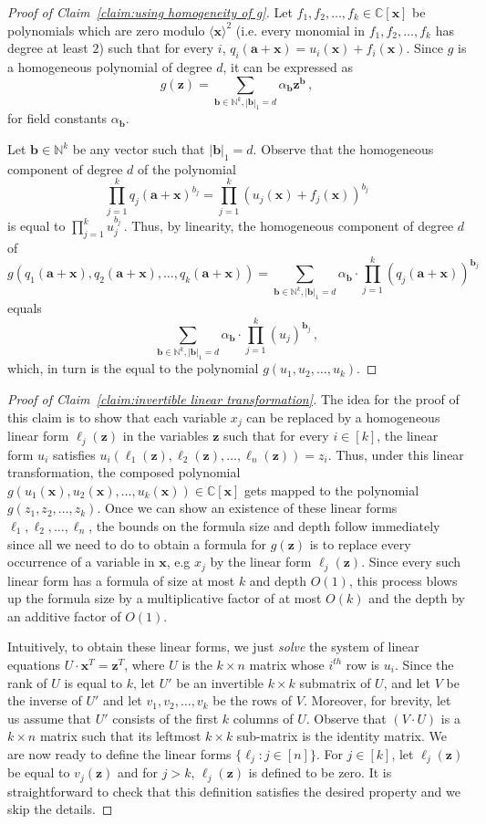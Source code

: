 \documentclass[10pt,a4paper]{article}
\theoremstyle{definition}
\newcommand{\F}{\mathbb C}
\newcommand{\N}{\mathbb N}
\newcommand{\va}{\mathbf a}
\newcommand{\vb}{\mathbf b}
\newcommand{\vx}{\mathbf x}
\newcommand{\vz}{\mathbf z}
\begin{document}
\begin{proof}[Proof of Claim~\ref{claim:using homogeneity of g}]
Let $f_1, f_2, \ldots, f_k \in \F[\vx]$ be polynomials which are zero modulo $\langle \vx \rangle^2$ (i.e. every monomial in $f_1, f_2, \ldots, f_k$ has degree at least $2$) such that for every $i$, $q_i(\va + \vx) = u_i(\vx) + f_i(\vx)$. Since $g$ is a  homogeneous polynomial of degree $d$, it can be expressed as 
\[
g(\vz) = \sum_{\vb \in \N^k, |\vb|_1 = d} \alpha_{\vb} \vz^{\vb} \,  ,
\] for field constants $\alpha_{\vb}$. 
%
  
Let $\vb \in \N^k$ be any vector such that $|\vb|_1 = d$. Observe that the homogeneous component of degree  $d$ of the polynomial 
\[
\prod_{j = 1}^k q_j(\va + \vx)^{b_j} = \prod_{j = 1}^k (u_j(\vx) + f_j(\vx))^{b_j}
\] is equal to $\prod_{j = 1}^k u_j^{b_j} \, .
$
  Thus, by linearity, the homogeneous component of degree $d$ of  \[
  g\left(q_1(\va + \vx), q_2(\va + \vx), \ldots, q_k(\va + \vx)\right) = \sum_{\vb \in \N^k, |\vb|_1 = d} \alpha_{\vb} \cdot \prod_{j = 1}^k (q_j(\va + \vx ))^{\vb_j}\]
   equals \[
   \sum_{\vb \in \N^k, |\vb|_1 = d} \alpha_{\vb}\cdot  \prod_{j = 1}^k (u_j)^{\vb_j} \, , 
   \] which, in turn is the equal to the polynomial $g(u_1, u_2, \ldots, u_k)$.
\end{proof} 
%
\begin{proof}[Proof of Claim~\ref{claim:invertible linear transformation}]
The idea for the proof of this claim is to show that each variable $x_j$ can be replaced by a homogeneous linear form $\ell_j(\vz)$ in the variables $\vz$ such that for every $i \in [k]$, the linear form $u_i$ satisfies $u_i(\ell_1(\vz), \ell_2(\vz), \ldots, \ell_n(\vz)) = z_i$. Thus, under this linear transformation, the composed polynomial $g(u_1(\vx), u_2(\vx), \ldots, u_k(\vx)) \in \F[\vx]$ gets mapped to the polynomial $g(z_1, z_2, \ldots, z_k)$.  Once we can show an existence of these linear forms $\ell_1, \ell_2, \ldots, \ell_n$, the bounds on the formula size and depth follow immediately since all we need to do to obtain a formula for $g(\vz)$ is to replace every occurrence of a variable in $\vx$, e.g $x_j$ by the linear form $\ell_j(\vz)$. Since every such linear form has a formula of size at most $k$ and depth $O(1)$, this process blows up the formula size by a multiplicative factor of at most $O(k)$ and the depth by an additive factor of $O(1)$. 

Intuitively, to obtain these linear forms, we just \emph{solve} the system of linear equations  $U \cdot \vx^{T} = \vz^T$, where $U$ is the $k \times n$ matrix whose $i^{th}$ row is $u_i$.  Since  the rank of $U$ is equal to $k$,  let $U'$ be an invertible $k \times k$ submatrix of $U$, and let $V$ be the inverse of $U'$ and let $v_1, v_2, \ldots, v_k$ be the rows of $V$. Moreover, for brevity, let us assume that $U'$ consists of the first $k$ columns of $U$. Observe that $(V\cdot U)$ is a $k \times n$ matrix such that its leftmost $k \times k$ sub-matrix is the identity matrix. We are now ready to define the linear forms $\{\ell_j : j \in [n]\}$.  For $j \in [k]$, let $\ell_j(\vz)$ be equal to $v_j(\vz)$ and for $j > k$, $\ell_j(\vz)$ is defined to be zero. It is straightforward to check that this definition satisfies the desired property and we skip the details. 
\end{proof}
%
\end{document}
